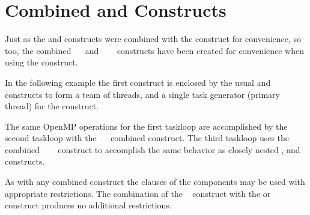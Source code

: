 \pagebreak
\section{Combined   and  Constructs}
\label{sec:parallel_masked_taskloop}

Just as the  and  constructs were combined
with the  construct for convenience, so too, the combined
~~ and 
~~~
constructs have been created for convenience when using the
 construct.
  
In the following example the first  construct is enclosed
by the usual  and  constructs to form
a team of threads, and a single task generator (primary thread) for
the  construct.

The same OpenMP operations for the first taskloop are accomplished by the second
taskloop with the ~~ 
combined construct. 
The third taskloop uses the combined ~~~ 
construct to accomplish the same behavior as closely nested ,
and  constructs.

As with any combined construct the clauses of the components may be used
with appropriate restrictions. The combination of the ~ construct
with the  or ~ construct produces no additional 
restrictions.

\clearpage

